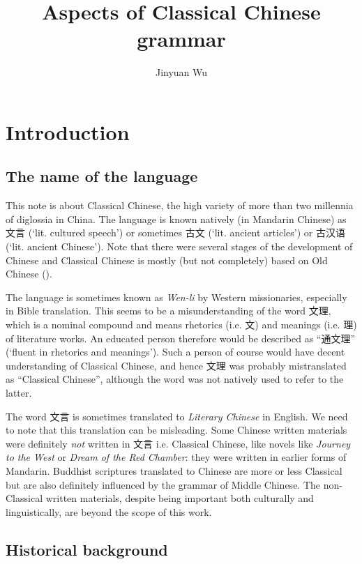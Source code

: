 \documentclass[UTF8, a4paper, oneside, scheme=plain, 12pt]{ctexrep}
\title{Aspects of Classical Chinese grammar}
\author{Jinyuan Wu}
\newcommand*{\term}[1]{\emph{#1}}
\newcommand{\form}[1]{\emph{#1}}
\newcommand{\work}[1]{\textit{#1}}
\newcommand{\translate}[1]{`#1'}
\begin{document}
\automath

\maketitle

\chapter{Introduction}

\section{The name of the language}

This note is about Classical Chinese,
the high variety of more than two millennia of diglossia in China.
The language is known natively (in Mandarin Chinese) as 文言 (\translate{lit. cultured speech})
or sometimes 古文 (\translate{lit. ancient articles})
or 古汉语 (\translate{lit. ancient Chinese}).
Note that there were several stages of the development of Chinese
and Classical Chinese is mostly (but not completely) based on Old Chinese
().

The language is sometimes known as \form{Wen-li} by Western missionaries,
especially in Bible translation.
This seems to be a misunderstanding of the word 文理,
which is a nominal compound and means rhetorics (i.e. 文) and meanings (i.e. 理) of literature works.
An educated person therefore would be described as ``通文理'' (\translate{fluent in rhetorics and meanings}).
Such a person of course would have decent understanding of Classical Chinese,
and hence 文理 was probably mistranslated as ``Classical Chinese'',
although the word was not natively used to refer to the latter.

The word 文言 is sometimes translated to \term{Literary Chinese} in English.
We need to note that this translation can be misleading.
Some Chinese written materials were definitely \emph{not} written in 文言 i.e. Classical Chinese,
like novels like \work{Journey to the West} or \work{Dream of the Red Chamber}:
they were written in earlier forms of Mandarin.
Buddhist scriptures translated to Chinese are more or less Classical
but are also definitely influenced by the grammar of Middle Chinese.
The non-Classical written materials, despite being important both culturally and linguistically,
are beyond the scope of this work.

\section{Historical background}\label{sec:introduction.history}
\end{document}
